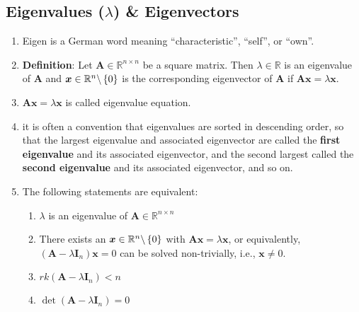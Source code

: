 \subsection{Eigenvalues ($\lambda$) \& Eigenvectors}

\begin{enumerate}
    \item Eigen is a German word meaning “characteristic”, “self”, or “own”.
    \hfill \cite{mfml/book/mml/Deisenroth-Faisal-Ong}

    \item \textbf{Definition}: Let $\bm{A} \in \mathbb{R}^{n\times n}$ be a square matrix. 
    Then $\lambda \in \mathbb{R}$ is an eigenvalue of $\bm{A}$ and $\bm{x} \in \mathbb{R}^n\backslash\left\{0\right\}$ is the corresponding eigenvector of $\bm{A}$ if
    $\bm{Ax} = \lambda \bm{x}$.
    \hfill \cite{mfml/book/mml/Deisenroth-Faisal-Ong}

    \item $\bm{Ax} = \lambda \bm{x}$ is called eigenvalue equation.
    \hfill \cite{mfml/book/mml/Deisenroth-Faisal-Ong}

    \item it is often a convention that eigenvalues are sorted in descending order, so that the largest eigenvalue and associated eigenvector are called the \textbf{first eigenvalue} and its associated eigenvector, and the second largest called the \textbf{second eigenvalue} and its associated eigenvector, and so on.
    \hfill \cite{mfml/book/mml/Deisenroth-Faisal-Ong}

    \item The following statements are equivalent:
    \begin{enumerate}
        \item $\lambda$ is an eigenvalue of $\bm{A} \in \mathbb{R}^{n\times n}$
        \hfill \cite{mfml/book/mml/Deisenroth-Faisal-Ong}

        \item There exists an $\bm{x} \in \mathbb{R}^n\backslash\left\{0\right\}$ with $\bm{Ax} = \lambda \bm{x}$, or equivalently, $(\bm{A} - \lambda \bm{I}_n)\bm{x} = 0$ can be solved non-trivially, i.e., $\bm{x} \neq 0$.
        \hfill \cite{mfml/book/mml/Deisenroth-Faisal-Ong}

        \item $rk(\bm{A} - \lambda \bm{I}_n) < n$
        \hfill \cite{mfml/book/mml/Deisenroth-Faisal-Ong}

        \item $\det(\bm{A} - \lambda \bm{I}_n) = 0$
        \hfill \cite{mfml/book/mml/Deisenroth-Faisal-Ong}
    \end{enumerate}


\end{enumerate}
